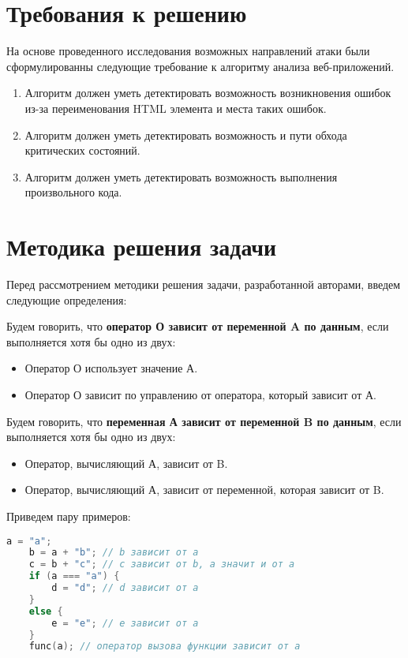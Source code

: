\section{Требования к решению}
На основе проведенного исследования возможных направлений атаки были сформулированны следующие требование к алгоритму анализа веб-приложений.

\begin{enumerate}
	\item Алгоритм должен уметь детектировать возможность возникновения ошибок из-за переименования HTML элемента и места таких ошибок.
	\item Алгоритм должен уметь детектировать возможность и пути обхода критических состояний.
	\item Алгоритм должен уметь детектировать возможность выполнения произвольного кода.
\end{enumerate}

\section{Методика решения задачи}
Перед рассмотрением методики решения задачи, разработанной авторами, введем следующие определения:


Будем говорить, что \textbf{оператор О зависит от переменной A по данным}, если выполняется хотя бы одно из двух:
\begin{itemize}
	\item Оператор О использует значение А.
	\item Оператор О зависит по управлению от оператора, который зависит от А.
\end{itemize}


Будем говорить, что \textbf{переменная А зависит от переменной B по данным}, если выполняется хотя бы одно из двух:
\begin{itemize}
	\item Оператор, вычисляющий А, зависит от B.
	\item Оператор, вычисляющий А, зависит от переменной, которая зависит от B.
\end{itemize}

\bigskip
Приведем пару примеров:
\begin{lstlisting}[language=C]
	a = "a";
	b = a + "b"; // b зависит от a
	c = b + "c"; // c зависит от b, а значит и от a
	if (a === "a") { 
		d = "d"; // d зависит от a
	}
	else {
		e = "e"; // e зависит от a
	}
	func(a); // оператор вызова функции зависит от a
\end{lstlisting}
\bigskip


